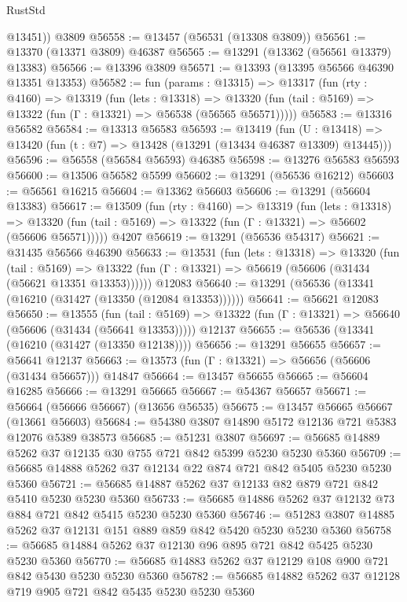 \begin{lexlean}{RustStd}
\begin{coremodule}
        @13451))
    @3809
@56558 := @13457 (@56531 (@13308 @3809))
@56561 := @13370 (@13371 @3809) @46387
@56565 := @13291 (@13362 (@56561 @13379) @13383)
@56566 := @13396 @3809
@56571 := @13393 (@13395 @56566 @46390 @13351 @13353)
@56582 := fun (params : @13315) =>
  @13317
    (fun (rty : @4160) =>
    @13319
      (fun (lets : @13318) =>
      @13320 (fun (tail : @5169) => @13322 (fun (Γ : @13321) => @56538 (@56565 @56571)))))
@56583 := @13316 @56582
@56584 := @13313 @56583
@56593 := @13419
    (fun (U : @13418) => @13420 (fun (t : @7) => @13428 (@13291 (@13434 @46387 @13309) @13445)))
@56596 := @56558 (@56584 @56593) @46385
@56598 := @13276 @56583 @56593
@56600 := @13506 @56582 @5599
@56602 := @13291 (@56536 @16212)
@56603 := @56561 @16215
@56604 := @13362 @56603
@56606 := @13291 (@56604 @13383)
@56617 := @13509
    (fun (rty : @4160) =>
    @13319
      (fun (lets : @13318) =>
      @13320 (fun (tail : @5169) => @13322 (fun (Γ : @13321) => @56602 (@56606 @56571)))))
    @4207
@56619 := @13291 (@56536 @54317)
@56621 := @31435 @56566 @46390
@56633 := @13531
    (fun (lets : @13318) =>
    @13320
      (fun (tail : @5169) =>
      @13322 (fun (Γ : @13321) => @56619 (@56606 (@31434 (@56621 @13351 @13353))))))
    @12083
@56640 := @13291 (@56536 (@13341 (@16210 (@31427 (@13350 (@12084 @13353))))))
@56641 := @56621 @12083
@56650 := @13555
    (fun (tail : @5169) => @13322 (fun (Γ : @13321) => @56640 (@56606 (@31434 (@56641 @13353)))))
    @12137
@56655 := @56536 (@13341 (@16210 (@31427 (@13350 @12138))))
@56656 := @13291 @56655
@56657 := @56641 @12137
@56663 := @13573 (fun (Γ : @13321) => @56656 (@56606 (@31434 @56657))) @14847
@56664 := @13457 @56655
@56665 := @56604 @16285
@56666 := @13291 @56665
@56667 := @54367 @56657
@56671 := @56664 (@56666 @56667) (@13656 @56535)
@56675 := @13457 @56665 @56667 (@13661 @56603)
@56684 := @54380 @3807 @14890 @5172 @12136 @721 @5383 @12076 @5389 @38573
@56685 := @51231 @3807
@56697 := @56685 @14889 @5262 @37 @12135 @30 @755 @721 @842 @5399 @5230 @5230 @5360
@56709 := @56685 @14888 @5262 @37 @12134 @22 @874 @721 @842 @5405 @5230 @5230 @5360
@56721 := @56685 @14887 @5262 @37 @12133 @82 @879 @721 @842 @5410 @5230 @5230 @5360
@56733 := @56685 @14886 @5262 @37 @12132 @73 @884 @721 @842 @5415 @5230 @5230 @5360
@56746 := @51283 @3807 @14885 @5262 @37 @12131 @151 @889 @859 @842 @5420 @5230 @5230 @5360
@56758 := @56685 @14884 @5262 @37 @12130 @96 @895 @721 @842 @5425 @5230 @5230 @5360
@56770 := @56685 @14883 @5262 @37 @12129 @108 @900 @721 @842 @5430 @5230 @5230 @5360
@56782 := @56685 @14882 @5262 @37 @12128 @719 @905 @721 @842 @5435 @5230 @5230 @5360

\end{coremodule}
\end{lexlean}

